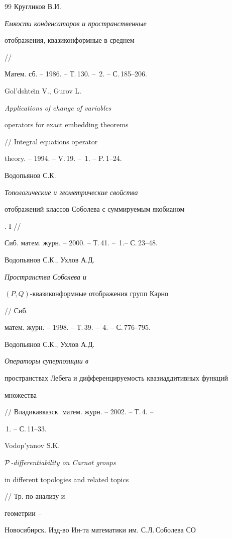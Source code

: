 \begin{thebibliography}{99}
Кругликов В.И. {\it Емкости конденсаторов и пространственные 


отображения, квазиконформные в среднем} //


Матем. сб. -- 1986. -- Т.\,130. -- \No\,2. -- С.\,185--206.







Gol'dshte\u\i{}n V., Gurov L. {\it Applications of change of variables 


operators for exact embedding theorems} // Integral equations operator 


theory. -- 1994. -- V.\,19. -- \No\,1. -- P.\,1--24.







Водопьянов С.К. {\it Топологические и геометрические свойства 


отображений классов Соболева с суммируемым якобианом}. I //


Сиб. матем. журн. -- 2000. -- Т.\,41. -- \No\,1.-- С.\,23--48.







Водопьянов С.К., Ухлов А.Д. {\it Пространства Соболева и


$(P,Q)$-квазиконформные отображения групп Карно} // Сиб.


матем. журн. -- 1998. -- Т.\,39. -- \No\,4. -- С.\,776--795.







Водопьянов С.К., Ухлов А.Д. {\it Операторы суперпозиции в


пространствах Лебега и дифференцируемость квазиаддитивных функций


множества} // Владикавказск. матем. журн. -- 2002. -- Т.\,4. --


\No\,1. -- С.\,11--33.







Vodop'yanov S.K. {\it $\cal P$-differentiability on Carnot groups


in different topologies and related topics} // Тр. по анализу и


геометрии --


Новосибирск. Изд-во Ин-та математики им. С.Л.\,Соболева СО



\end{thebibliography}
